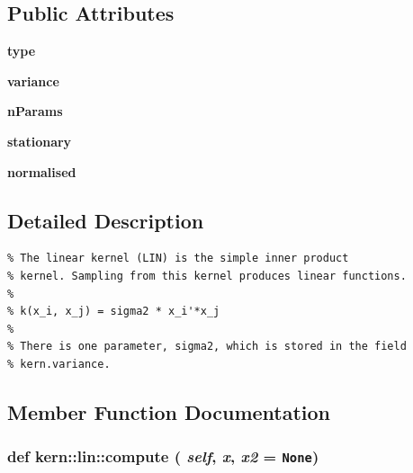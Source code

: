 \subsection*{Public Attributes}
\begin{CompactItemize}
\item 
\hypertarget{classkern_1_1lin_7b8c7bfd522d43511f45e7600f27d96a}{
\textbf{type}}
\label{classkern_1_1lin_7b8c7bfd522d43511f45e7600f27d96a}

\item 
\hypertarget{classkern_1_1lin_7dd1e0c7b4da8511fafb470561ef73c9}{
\textbf{variance}}
\label{classkern_1_1lin_7dd1e0c7b4da8511fafb470561ef73c9}

\item 
\hypertarget{classkern_1_1lin_b6cf32694074ab487cf883586ed9e21a}{
\textbf{nParams}}
\label{classkern_1_1lin_b6cf32694074ab487cf883586ed9e21a}

\item 
\hypertarget{classkern_1_1lin_5bfe56620dee043db851907a417ef8bb}{
\textbf{stationary}}
\label{classkern_1_1lin_5bfe56620dee043db851907a417ef8bb}

\item 
\hypertarget{classkern_1_1lin_5757cdc7b0312d33bd03db9c9164d65a}{
\textbf{normalised}}
\label{classkern_1_1lin_5757cdc7b0312d33bd03db9c9164d65a}

\end{CompactItemize}


\subsection{Detailed Description}


\footnotesize\begin{verbatim}% The linear kernel (LIN) is the simple inner product
% kernel. Sampling from this kernel produces linear functions.
%
% k(x_i, x_j) = sigma2 * x_i'*x_j
%
% There is one parameter, sigma2, which is stored in the field
% kern.variance.

\end{verbatim}
\normalsize
 

\subsection{Member Function Documentation}
\hypertarget{classkern_1_1lin_38ca0676026a784df6529071fa572514}{
\subsubsection[{compute}]{\setlength{\rightskip}{0pt plus 5cm}def kern::lin::compute ( {\em self}, \/   {\em x}, \/   {\em x2} = {\tt None})}}
\label{classkern_1_1lin_38ca0676026a784df6529071fa572514}




